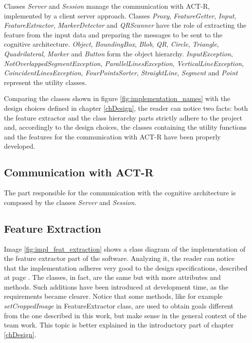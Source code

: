 		Classes \emph{Server} and \emph{Session} manage the communication with \mbox{ACT-R}, implemented by a client server approach.
		Classes \emph{Proxy}, \emph{FeatureGetter}, \emph{Input}, \emph{FeatureExtractor}, \emph{MarkerDetector} and \emph{QRScanner} have the role of extracting the feature from the input data and preparing the messages to be sent to the cognitive architecture.
		\emph{Object}, \emph{BoundingBox}, \emph{Blob}, \emph{QR}, \emph{Circle}, \emph{Triangle}, \emph{Quadrilateral}, \emph{Marker} and \emph{Button} form the object hierarchy.
		\emph{InputException}, \emph{NotOverlappedSegmentException}, \emph{ParallelLinesException}, \emph{VerticalLineException}, \emph{CoincidentLinesException}, \emph{FourPointsSorter}, \emph{StraightLine}, \emph{Segment} and \emph{Point} represent the utility classes.
	
		Comparing the classes shown in figure \ref{fig:implementation_names} with the design choices defined in chapter \ref{chDesign}, the reader can notice two facts: both the feature extractor and the class hierarchy parts strictly adhere to the project and, accordingly to the design choices, the classes containing the utility functions and the features for the communication with \mbox{ACT-R} have been properly developed.

	
		\subsection{Communication with ACT-R}
		The part responsible for the communication with the cognitive architecture is composed by the classes \emph{Server} and \emph{Session}. \todo{}

\newpage
		\subsection{Feature Extraction}
		Image \ref{fig:impl_feat_extraction} shows a class diagram of the implementation of the feature extractor part of the software. 
		Analyzing it, the reader can notice that the implementation adheres very good to the design specifications, described at page \pageref{featExtraction}. 
		The classes, in fact, are the same but with more attributes and methods. 
		Such additions have been introduced at development time, as the requirements became clearer.
		Notice that some methods, like for example \emph{setCroppedImage} in FeatureExtractor class, are used to obtain goals different from the one described in this work, but make sense in the general context of the team work. This topic is better explained in the introductory part of chapter \ref{chDesign}. 

